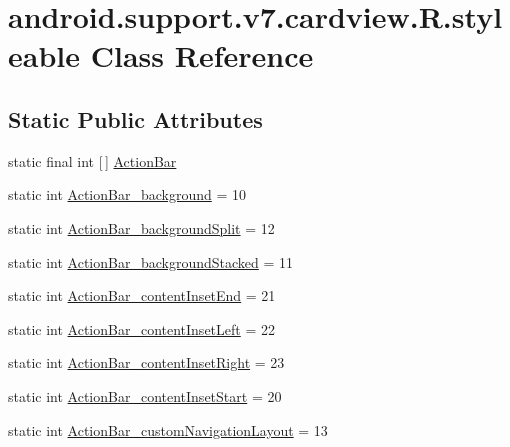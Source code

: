 \hypertarget{classandroid_1_1support_1_1v7_1_1cardview_1_1R_1_1styleable}{}\section{android.\+support.\+v7.\+cardview.\+R.\+styleable Class Reference}
\label{classandroid_1_1support_1_1v7_1_1cardview_1_1R_1_1styleable}
\subsection*{Static Public Attributes}
\begin{DoxyCompactItemize}
\item 
static final int \mbox{[}$\,$\mbox{]} \hyperlink{classandroid_1_1support_1_1v7_1_1cardview_1_1R_1_1styleable_a0cbf7f776e31f78bb0a2b558daf176f8}{Action\+Bar}
\item 
static int \hyperlink{classandroid_1_1support_1_1v7_1_1cardview_1_1R_1_1styleable_ab3e16d6ff13e6ecbe49a20c53d18a111}{Action\+Bar\+\_\+background} = 10
\item 
static int \hyperlink{classandroid_1_1support_1_1v7_1_1cardview_1_1R_1_1styleable_a31aed5097d7cbebad3a2c4f5a9cee19a}{Action\+Bar\+\_\+background\+Split} = 12
\item 
static int \hyperlink{classandroid_1_1support_1_1v7_1_1cardview_1_1R_1_1styleable_ae8cef0aa1d4b10f1ae6ef92ca895778d}{Action\+Bar\+\_\+background\+Stacked} = 11
\item 
static int \hyperlink{classandroid_1_1support_1_1v7_1_1cardview_1_1R_1_1styleable_ac13a0473d17683dad10beff0e1f9627b}{Action\+Bar\+\_\+content\+Inset\+End} = 21
\item 
static int \hyperlink{classandroid_1_1support_1_1v7_1_1cardview_1_1R_1_1styleable_a25616fd348d614fe488889ce0079c9e9}{Action\+Bar\+\_\+content\+Inset\+Left} = 22
\item 
static int \hyperlink{classandroid_1_1support_1_1v7_1_1cardview_1_1R_1_1styleable_aa43e0bb7411ac41bac49b12fad85a806}{Action\+Bar\+\_\+content\+Inset\+Right} = 23
\item 
static int \hyperlink{classandroid_1_1support_1_1v7_1_1cardview_1_1R_1_1styleable_a7e19145090b9eaa2625e1b3640a6d252}{Action\+Bar\+\_\+content\+Inset\+Start} = 20
\item 
static int \hyperlink{classandroid_1_1support_1_1v7_1_1cardview_1_1R_1_1styleable_a93ac940816d8b8b67d888d7020292361}{Action\+Bar\+\_\+custom\+Navigation\+Layout} = 13

\end{DoxyCompactItemize}
